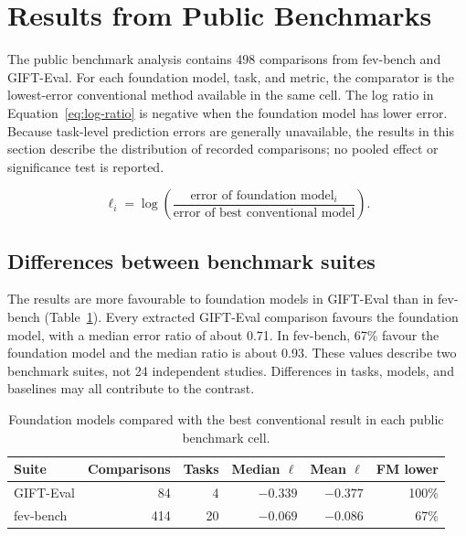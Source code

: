 \section{Results from Public Benchmarks}
\label{sec:metaanalysis}\label{sec:meta-regression}\label{sec:metareg}

The public benchmark analysis contains 498 comparisons from fev-bench and
GIFT-Eval. For each foundation model, task, and metric, the comparator is the
lowest-error conventional method available in the same cell. The log ratio in
Equation~\ref{eq:log-ratio} is negative when the foundation model has lower
error. Because task-level prediction errors are generally unavailable, the
results in this section describe the distribution of recorded comparisons; no
pooled effect or significance test is reported.
\label{subsec:pooling-strategy}\label{subsec:sensitivity}
\label{sec:heterogeneity}\label{subsec:removed-funnel-plot}

\begin{equation}
  \ell_i=\log\left(
  \frac{\text{error of foundation model}_i}
       {\text{error of best conventional model}}
  \right).
  \label{eq:log-ratio}
\end{equation}

\subsection{Differences between benchmark suites}
\label{subsec:cross-paper-pooled}\label{sec:rq1-accuracy}

The results are more favourable to foundation models in GIFT-Eval than in
fev-bench (Table~\ref{tab:suite-summary}). Every extracted GIFT-Eval
comparison favours the foundation model, with a median error ratio of about
0.71. In fev-bench, 67\% favour the foundation model and the median ratio is
about 0.93. These values describe two benchmark suites, not 24 independent
studies. Differences in tasks, models, and baselines may all contribute to the
contrast.

\begin{table}[htbp]
\centering
\caption{Foundation models compared with the best conventional result in each
public benchmark cell.}
\label{tab:suite-summary}
\small
\begin{tabular}{lrrrrr}
\toprule
Suite & Comparisons & Tasks & Median $\ell$ & Mean $\ell$ & FM lower \\
\midrule
GIFT-Eval & 84 & 4 & $-0.339$ & $-0.377$ & 100\% \\
fev-bench & 414 & 20 & $-0.069$ & $-0.086$ & 67\% \\
\bottomrule
\end{tabular}
\end{table}

